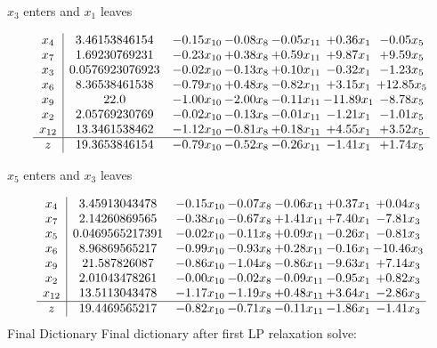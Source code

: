\documentclass[8pt]{article}
\begin{document}
 $ x_{3} $ enters and $ x_{1} $ leaves 

 \[\begin{array}{c| c c@{\hskip 2pt} c@{\hskip 2pt} c@{\hskip 2pt} c@{\hskip 2pt} c@{\hskip 2pt} }
 x_{4}   &  3.46153846154 & -0.15 x_{10} & -0.08 x_{8} & -0.05 x_{11} & +  0.36 x_{1} & -0.05 x_{5}\\
 x_{7}   &  1.69230769231 & -0.23 x_{10} & +  0.38 x_{8} & +  0.59 x_{11} & +  9.87 x_{1} & +  9.59 x_{5}\\
 x_{3}   &  0.0576923076923 & -0.02 x_{10} & -0.13 x_{8} & +  0.10 x_{11} & -0.32 x_{1} & -1.23 x_{5}\\
 x_{6}   &  8.36538461538 & -0.79 x_{10} & +  0.48 x_{8} & -0.82 x_{11} & +  3.15 x_{1} & + 12.85 x_{5}\\
 x_{9}   &  22.0 & -1.00 x_{10} & -2.00 x_{8} & -0.11 x_{11} & -11.89 x_{1} & -8.78 x_{5}\\
 x_{2}   &  2.05769230769 & -0.02 x_{10} & -0.13 x_{8} & -0.01 x_{11} & -1.21 x_{1} & -1.01 x_{5}\\
 x_{12}   &  13.3461538462 & -1.12 x_{10} & -0.81 x_{8} & +  0.18 x_{11} & +  4.55 x_{1} & +  3.52 x_{5}\\
\hline
z    &  19.3653846154 & -0.79 x_{10} & -0.52 x_{8} & -0.26 x_{11} & -1.41 x_{1} & +  1.74 x_{5}\\
\end{array}\]


 $ x_{5} $ enters and $ x_{3} $ leaves 

 \[\begin{array}{c| c c@{\hskip 2pt} c@{\hskip 2pt} c@{\hskip 2pt} c@{\hskip 2pt} c@{\hskip 2pt} }
 x_{4}   &  3.45913043478 & -0.15 x_{10} & -0.07 x_{8} & -0.06 x_{11} & +  0.37 x_{1} & +  0.04 x_{3}\\
 x_{7}   &  2.14260869565 & -0.38 x_{10} & -0.67 x_{8} & +  1.41 x_{11} & +  7.40 x_{1} & -7.81 x_{3}\\
 x_{5}   &  0.0469565217391 & -0.02 x_{10} & -0.11 x_{8} & +  0.09 x_{11} & -0.26 x_{1} & -0.81 x_{3}\\
 x_{6}   &  8.96869565217 & -0.99 x_{10} & -0.93 x_{8} & +  0.28 x_{11} & -0.16 x_{1} & -10.46 x_{3}\\
 x_{9}   &  21.587826087 & -0.86 x_{10} & -1.04 x_{8} & -0.86 x_{11} & -9.63 x_{1} & +  7.14 x_{3}\\
 x_{2}   &  2.01043478261 & -0.00 x_{10} & -0.02 x_{8} & -0.09 x_{11} & -0.95 x_{1} & +  0.82 x_{3}\\
 x_{12}   &  13.5113043478 & -1.17 x_{10} & -1.19 x_{8} & +  0.48 x_{11} & +  3.64 x_{1} & -2.86 x_{3}\\
\hline
z    &  19.4469565217 & -0.82 x_{10} & -0.71 x_{8} & -0.11 x_{11} & -1.86 x_{1} & -1.41 x_{3}\\
\end{array}\]
Final Dictionary
Final dictionary after first LP relaxation solve: 
\end{document}

